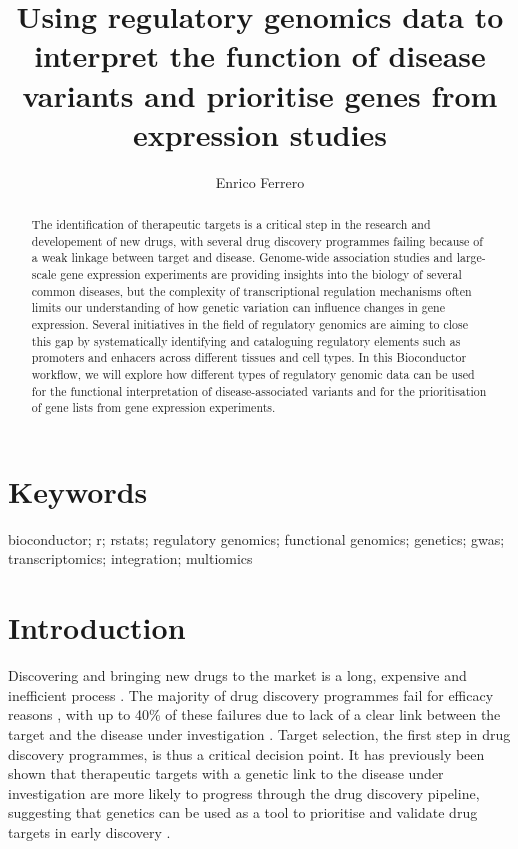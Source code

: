 \documentclass[9pt,a4paper,]{extarticle}
\theoremstyle{definition}
\theoremstyle{definition}
\theoremstyle{definition}
\theoremstyle{remark}
\begin{document}
\pagestyle{front}

\title{Using regulatory genomics data to interpret the function of disease variants and prioritise genes from expression studies}

\author{Enrico Ferrero}

\maketitle
\thispagestyle{front}

\begin{abstract}
The identification of therapeutic targets is a critical step in the research and developement of new drugs, with several drug discovery programmes failing because of a weak linkage between target and disease. Genome-wide association studies and large-scale gene expression experiments are providing insights into the biology of several common diseases, but the complexity of transcriptional regulation mechanisms often limits our understanding of how genetic variation can influence changes in gene expression. Several initiatives in the field of regulatory genomics are aiming to close this gap by systematically identifying and cataloguing regulatory elements such as promoters and enhacers across different tissues and cell types. In this Bioconductor workflow, we will explore how different types of regulatory genomic data can be used for the functional interpretation of disease-associated variants and for the prioritisation of gene lists from gene expression experiments.
\end{abstract}

\section*{Keywords}
bioconductor; r; rstats; regulatory genomics; functional genomics; genetics; gwas; transcriptomics; integration; multiomics


\clearpage
\pagestyle{main}

\section{Introduction}\label{introduction}

Discovering and bringing new drugs to the market is a long, expensive and inefficient process \citep{Waring2015, DiMasi2016}.
The majority of drug discovery programmes fail for efficacy reasons \citep{Harrison2016}, with up to 40\% of these failures due to lack of a clear link between the target and the disease under investigation \citep{Cook2014}.
Target selection, the first step in drug discovery programmes, is thus a critical decision point.
It has previously been shown that therapeutic targets with a genetic link to the disease under investigation are more likely to progress through the drug discovery pipeline, suggesting that genetics can be used as a tool to prioritise and validate drug targets in early discovery \citep{Plenge2013, Nelson2015}.
\end{document}
